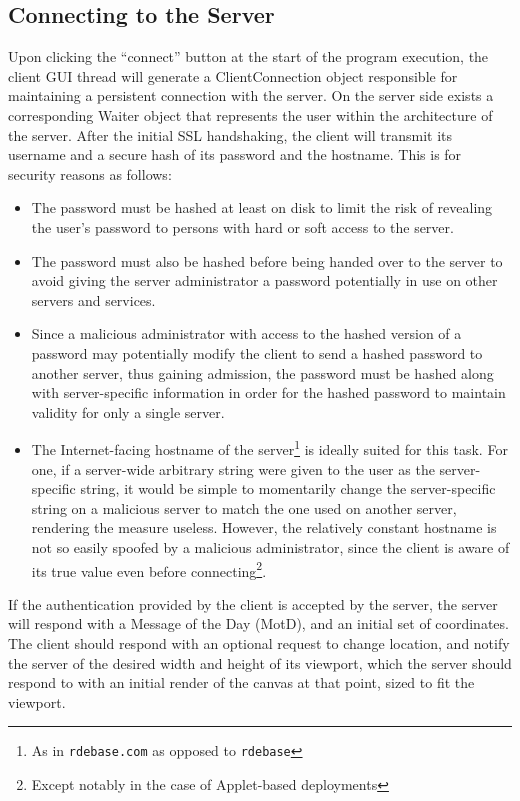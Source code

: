 \documentclass[11pt,oneside,a4paper]{article}
\begin{document}
 \subsection{Connecting to the Server}
  Upon clicking the ``connect'' button at the start of the program execution,
  the client GUI thread will generate a ClientConnection object responsible for
  maintaining a persistent connection with the server. On the server side exists
  a corresponding Waiter object that represents the user within the architecture
  of the server. After the initial SSL handshaking, the client will transmit its
  username and a secure hash of its password and the hostname. This is for
  security reasons as follows:
  \begin{itemize}
   \item
    The password must be hashed at least on disk to limit the risk of revealing
    the user's password to persons with hard or soft access to the server.
   \item
    The password must also be hashed before being handed over to the server to
    avoid giving the server administrator a password potentially in use on other
    servers and services.
   \item
    Since a malicious administrator with access to the hashed version of a
    password may potentially modify the client to send a hashed password to another
    server, thus gaining admission, the password must be hashed along with
    server-specific information in order for the hashed password to maintain
    validity for only a single server.
   \item
    The Internet-facing hostname of the server\footnote{As in
    \texttt{rdebase.com} as opposed to \texttt{rdebase}} is ideally suited for
    this task. For one, if a server-wide arbitrary string were given to the user as
    the server-specific string, it would be simple to momentarily change the
    server-specific string on a malicious server to match the one used on another
    server, rendering the measure useless. However, the relatively constant
    hostname is not so easily spoofed by a malicious administrator, since the
    client is aware of its true value even before connecting\footnote{Except
    notably in the case of Applet-based deployments}.
  \end{itemize}
  If the authentication provided by the client is accepted by the server, the
  server will respond with a Message of the Day (MotD), and an initial set of
  coordinates. The client should respond with an optional request to change
  location, and notify the server of the desired width and height of its
  viewport, which the server should respond to with an initial render of the
  canvas at that point, sized to fit the viewport.
\end{document}
